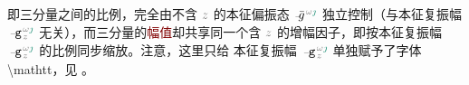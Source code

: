 即三分量之间的比例，完全由不含 $\mathcolor{gray}{z}$ 的\textcolor{PineGreen}{本征偏振态} $\xint{{}^{}_{\mathcolor{gray}{-}}}{10}{\bar{g}}^{\;\!\mathcolor{gray}{\omega} \textcolor{PineGreen}{\jmath}}$ 独立控制（与\textcolor{PineGreen}{本征复振幅} $\xint{\begin{smallmatrix} ~ \\ {}^{}_{\mathcolor{gray}{-}} \\ ~ \end{smallmatrix}}{09}{\mathtt{g}}^{\;\!\mathcolor{gray}{\omega} \textcolor{PineGreen}{\jmath}}_{\;\! \mathcolor{gray}{z}}$ 无关），而三分量的\textcolor{Maroon}{幅值}却共享同一个含 $\mathcolor{gray}{z}$ 的增幅因子，即按\textcolor{PineGreen}{本征复振幅} $\xint{\begin{smallmatrix} ~ \\ {}^{}_{\mathcolor{gray}{-}} \\ ~ \end{smallmatrix}}{09}{\mathtt{g}}^{\;\!\mathcolor{gray}{\omega} \textcolor{PineGreen}{\jmath}}_{\;\! \mathcolor{gray}{z}}$ 的比例同步缩放。注意，这里只给 \textcolor{PineGreen}{本征复振幅} $\xint{\begin{smallmatrix} ~ \\ {}^{}_{\mathcolor{gray}{-}} \\ ~ \end{smallmatrix}}{09}{\mathtt{g}}^{\;\!\mathcolor{gray}{\omega} \textcolor{PineGreen}{\jmath}}_{\;\! \mathcolor{gray}{z}}$ 单独赋予了字体 \textbackslash mathtt，见 。

